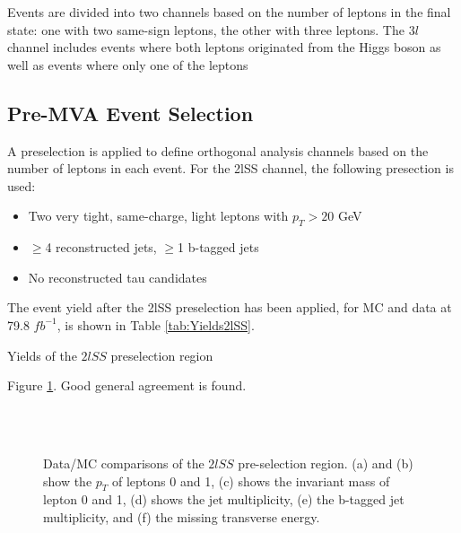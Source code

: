 Events are divided into two channels based on the number of leptons in the final state: one with two same-sign leptons, the other with three leptons. The $3l$ channel includes events where both leptons originated from the Higgs boson as well as events where only one of the leptons 


\subsection{Pre-MVA Event Selection}
\label{subsec:preMVA}

A preselection is applied to define orthogonal analysis channels based on the number of leptons in each event. For the 2lSS channel, the following presection is used:

\begin{itemize}
  \item Two very tight, same-charge, light leptons with $p_T > 20$ GeV
  \item $\geq$4 reconstructed jets, $\geq$1 b-tagged jets
  \item No reconstructed tau candidates
\end{itemize}

The event yield after the 2lSS preselection has been applied, for MC and data at 79.8 $fb^{-1}$, is shown in Table \ref{tab:Yields2lSS}. 

\begin{table}[H]

\label{tab:Yields2lSS}
\caption{Yields of the $2lSS$ preselection region}
\end{table}

Figure \ref{fig:presel2lSS}. Good general agreement is found.

\begin{figure}[H]
    \centering
    \\
    \\
    \caption{Data/MC comparisons of the $2lSS$ pre-selection region. (a) and (b) show the $p_T$ of leptons 0 and 1, (c) shows the invariant mass of lepton 0 and 1, (d) shows the jet multiplicity, (e) the b-tagged jet multiplicity, and (f) the missing transverse energy.}                           
    \label{fig:presel2lSS}
\end{figure}

